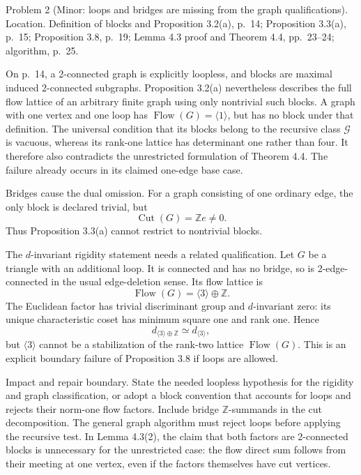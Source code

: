 \documentclass[10pt]{article}
\begin{document}
Problem 2 (Minor: loops and bridges are missing from the graph qualifications).  Location. Definition of blocks and Proposition 3.2(a), p. 14; Proposition 3.3(a), p. 15; Proposition 3.8, p. 19; Lemma 4.3 proof and Theorem 4.4, pp. 23–24; algorithm, p. 25.\par
On p. 14, a 2-connected graph is explicitly loopless, and blocks are maximal induced 2-connected subgraphs. Proposition 3.2(a) nevertheless describes the full flow lattice of an arbitrary finite graph using only nontrivial such blocks. A graph with one vertex and one loop has \(\operatorname{Flow}(G)=\langle1\rangle\), but has no block under that definition. The universal condition that its blocks belong to the recursive class \(\mathcal G\) is vacuous, whereas its rank-one lattice has determinant one rather than four. It therefore also contradicts the unrestricted formulation of Theorem 4.4. The failure already occurs in its claimed one-edge base case.\par
Bridges cause the dual omission. For a graph consisting of one ordinary edge, the only block is declared trivial, but \[\operatorname{Cut}(G)=\mathbb Ze\ne0.                                \tag{2.4}\] Thus Proposition 3.3(a) cannot restrict to nontrivial blocks.\par
The \(d\)-invariant rigidity statement needs a related qualification. Let \(G\) be a triangle with an additional loop. It is connected and has no bridge, so is 2-edge-connected in the usual edge-deletion sense. Its flow lattice is \[\operatorname{Flow}(G)=\langle3\rangle\oplus\mathbb Z.\] The Euclidean factor has trivial discriminant group and \(d\)-invariant zero: its unique characteristic coset has minimum square one and rank one. Hence \[d_{\langle3\rangle\oplus\mathbb Z}\simeq d_{\langle3\rangle},
 \tag{2.5}\] but \(\langle3\rangle\) cannot be a stabilization of the rank-two lattice \(\operatorname{Flow}(G)\). This is an explicit boundary failure of Proposition 3.8 if loops are allowed.\par
Impact and repair boundary. State the needed loopless hypothesis for the rigidity and graph classification, or adopt a block convention that accounts for loops and rejects their norm-one flow factors. Include bridge \(\mathbb Z\)-summands in the cut decomposition. The general graph algorithm must reject loops before applying the recursive test. In Lemma 4.3(2), the claim that both factors are 2-connected blocks is unnecessary for the unrestricted case: the flow direct sum follows from their meeting at one vertex, even if the factors themselves have cut vertices.\par
\end{document}

